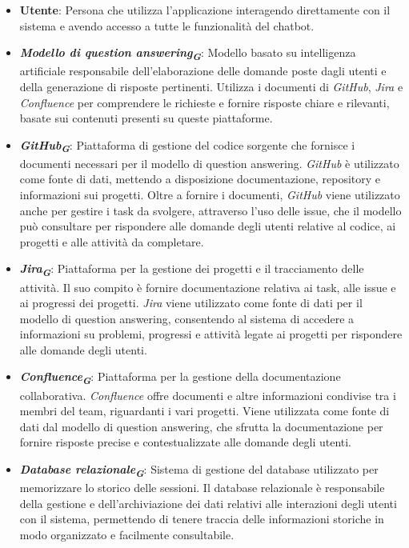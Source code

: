 \begin{itemize}
    \item \textbf{Utente}: Persona che utilizza l'applicazione interagendo direttamente con il sistema e avendo accesso a tutte le funzionalità del chatbot.
    \item \textbf{\emph{Modello di question answering}\textsubscript{\textbf{\textit{G}}}}: Modello basato su intelligenza artificiale responsabile dell'elaborazione delle domande poste dagli utenti e della generazione di risposte pertinenti. Utilizza i documenti di \emph{GitHub}, \emph{Jira} e \emph{Confluence} per comprendere le richieste e fornire risposte chiare e rilevanti, basate sui contenuti presenti su queste piattaforme.
    \item \textbf{\emph{GitHub}\textsubscript{\textbf{\textit{G}}}}: Piattaforma di gestione del codice sorgente che fornisce i documenti necessari per il modello di question answering. \emph{GitHub} è utilizzato come fonte di dati, mettendo a disposizione documentazione, repository e informazioni sui progetti. Oltre a fornire i documenti, \emph{GitHub} viene utilizzato anche per gestire i task da svolgere, attraverso l'uso delle issue, che il modello può consultare per rispondere alle domande degli utenti relative al codice, ai progetti e alle attività da completare.
    \item \textbf{\emph{Jira}\textsubscript{\textbf{\textit{G}}}}: Piattaforma per la gestione dei progetti e il tracciamento delle attività. Il suo compito è fornire documentazione relativa ai task, alle issue e ai progressi dei progetti. \emph{Jira} viene utilizzato come fonte di dati per il modello di question answering, consentendo al sistema di accedere a informazioni su problemi, progressi e attività legate ai progetti per rispondere alle domande degli utenti.
    \item \textbf{\emph{Confluence}\textsubscript{\textbf{\textit{G}}}}: Piattaforma per la gestione della documentazione collaborativa. \emph{Confluence} offre documenti e altre informazioni condivise tra i membri del team, riguardanti i vari progetti. Viene utilizzata come fonte di dati dal modello di question answering, che sfrutta la documentazione per fornire risposte precise e contestualizzate alle domande degli utenti.
    \item \textbf{\emph{Database relazionale}\textsubscript{\textbf{\textit{G}}}}: Sistema di gestione del database utilizzato per memorizzare lo storico delle sessioni. Il database relazionale è responsabile della gestione e dell'archiviazione dei dati relativi alle interazioni degli utenti con il sistema, permettendo di tenere traccia delle informazioni storiche in modo organizzato e facilmente consultabile.

\end{itemize}
